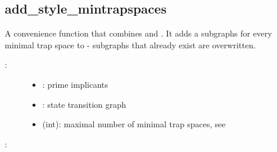 \documentclass[letterpaper,10pt,english]{sphinxmanual}
\begin{document}
\subsection{add\_style\_mintrapspaces}
\label{\detokenize{StateTransitionGraphs:add-style-mintrapspaces}}\label{\detokenize{StateTransitionGraphs:id24}}

\begin{fulllineitems}
\label{\detokenize{StateTransitionGraphs:PyBoolNet.StateTransitionGraphs.add_style_mintrapspaces}}
A convenience function that combines {\hyperref[\detokenize{StateTransitionGraphs:add-style-subspaces}]{}} and {\hyperref[\detokenize{AspSolver:trap-spaces}]{}}.
It adds a  subgraphs for every minimal trap space to  - subgraphs that already exist are overwritten.
\begin{description}
\item[{:}] \leavevmode\begin{itemize}
\item {} 
: prime implicants

\item {} 
: state transition graph

\item {} 
 (int): maximal number of minimal trap spaces, see 

\end{itemize}

\end{description}

:

\begin{sphinxVerbatim}[commandchars=\\\{\}]
 
\end{sphinxVerbatim}

\end{fulllineitems}
\end{document}
